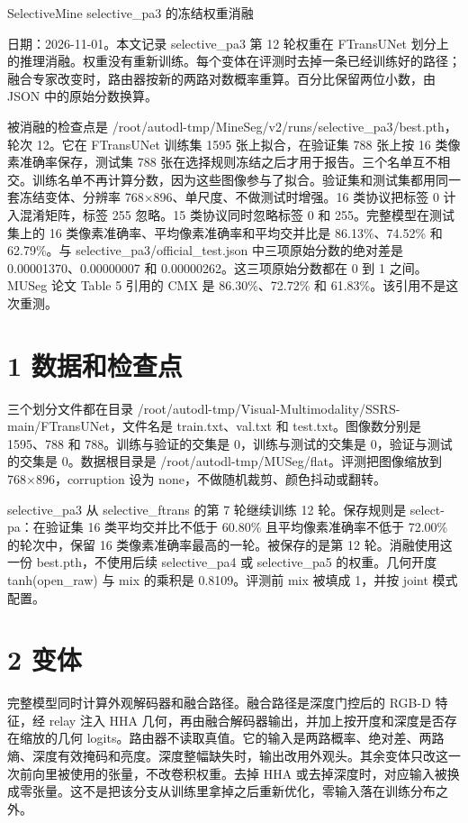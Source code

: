 \documentclass[11pt]{article}
\begin{document}
{\centering\Large SelectiveMine selective\_pa3 的冻结权重消融\par}
\vspace{0.8em}
日期：2026-11-01。本文记录 selective\_pa3 第 12 轮权重在 FTransUNet 划分上的推理消融。权重没有重新训练。每个变体在评测时去掉一条已经训练好的路径；融合专家改变时，路由器按新的两路对数概率重算。百分比保留两位小数，由 JSON 中的原始分数换算。

被消融的检查点是 /root/autodl-tmp/MineSeg/v2/runs/selective\_pa3/best.pth，轮次 12。它在 FTransUNet 训练集 1595 张上拟合，在验证集 788 张上按 16 类像素准确率保存，测试集 788 张在选择规则冻结之后才用于报告。三个名单互不相交。训练名单不再计算分数，因为这些图像参与了拟合。验证集和测试集都用同一套冻结变体、分辨率 768×896、单尺度、不做测试时增强。16 类协议把标签 0 计入混淆矩阵，标签 255 忽略。15 类协议同时忽略标签 0 和 255。完整模型在测试集上的 16 类像素准确率、平均像素准确率和平均交并比是 86.13\%、74.52\% 和 62.79\%。与 selective\_pa3/official\_test.json 中三项原始分数的绝对差是 0.00001370、0.00000007 和 0.00000262。这三项原始分数都在 0 到 1 之间。MUSeg 论文 Table 5 引用的 CMX 是 86.30\%、72.72\% 和 61.83\%。该引用不是这次重测。

\section*{1  数据和检查点}
三个划分文件都在目录 /root/autodl-tmp/Visual-Multimodality/SSRS-main/FTransUNet，文件名是 train.txt、val.txt 和 test.txt。图像数分别是 1595、788 和 788。训练与验证的交集是 0，训练与测试的交集是 0，验证与测试的交集是 0。数据根目录是 /root/autodl-tmp/MUSeg/flat。评测把图像缩放到 768×896，corruption 设为 none，不做随机裁剪、颜色抖动或翻转。

selective\_pa3 从 selective\_ftrans 的第 7 轮继续训练 12 轮。保存规则是 select-pa：在验证集 16 类平均交并比不低于 60.80\% 且平均像素准确率不低于 72.00\% 的轮次中，保留 16 类像素准确率最高的一轮。被保存的是第 12 轮。消融使用这一份 best.pth，不使用后续 selective\_pa4 或 selective\_pa5 的权重。几何开度 tanh(open\_raw) 与 mix 的乘积是 0.8109。评测前 mix 被填成 1，并按 joint 模式配置。

\section*{2  变体}
完整模型同时计算外观解码器和融合路径。融合路径是深度门控后的 RGB-D 特征，经 relay 注入 HHA 几何，再由融合解码器输出，并加上按开度和深度是否存在缩放的几何 logits。路由器不读取真值。它的输入是两路概率、绝对差、两路熵、深度有效掩码和亮度。深度整幅缺失时，输出改用外观头。其余变体只改这一次前向里被使用的张量，不改卷积权重。去掉 HHA 或去掉深度时，对应输入被换成零张量。这不是把该分支从训练里拿掉之后重新优化，零输入落在训练分布之外。
\end{document}
